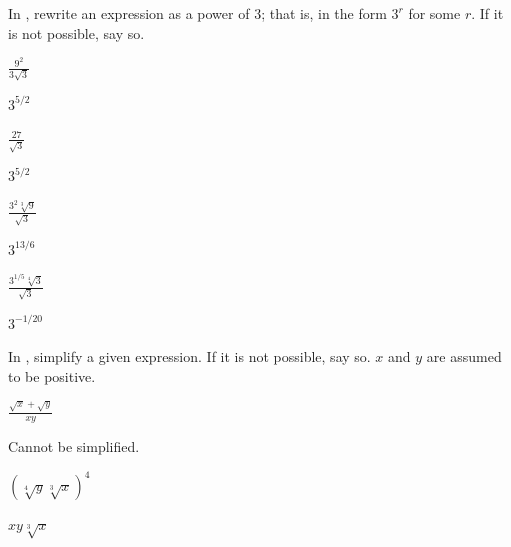 \noindent In , rewrite an expression as a power of $3$; that is, in the form $3^r$ for some $r$. If it is not possible, say so.


\begin{exercise}\label{exercise-4.2.7}
$\displaystyle \frac{9^2}{3\sqrt{3}}$
\end{exercise}

\begin{solution}
$3^{5/2}$
\end{solution}

\begin{exercise}
$\displaystyle \frac{27}{\sqrt{3}}$
\end{exercise}

\begin{solution}
$3^{5/2}$
\end{solution}

\begin{exercise}
$\displaystyle \frac{3^2\sqrt[3]{9}}{\sqrt{3}}$
\end{exercise}

\begin{solution}
$3^{13/6}$
\end{solution}

\begin{exercise}\label{exercise-4.2.10}
$\displaystyle \frac{3^{1/5}\sqrt[4]{3}}{\sqrt{3}}$
\end{exercise}

\begin{solution}
$3^{-1/20}$
\end{solution}





\noindent In , simplify a given expression. If it is not possible, say so. $x$ and $y$ are assumed to be positive.

\begin{exercise}\label{exercise-4.2.11}
$\displaystyle \frac{\sqrt{x}+\sqrt{y}}{xy}$
\end{exercise}

\begin{solution}
Cannot be simplified.
\end{solution}

\begin{exercise}
$\displaystyle (\sqrt[4]{y}\sqrt[3]{x})^4$
\end{exercise}

\begin{solution}
$xy\sqrt[3]{x}$
\end{solution}


